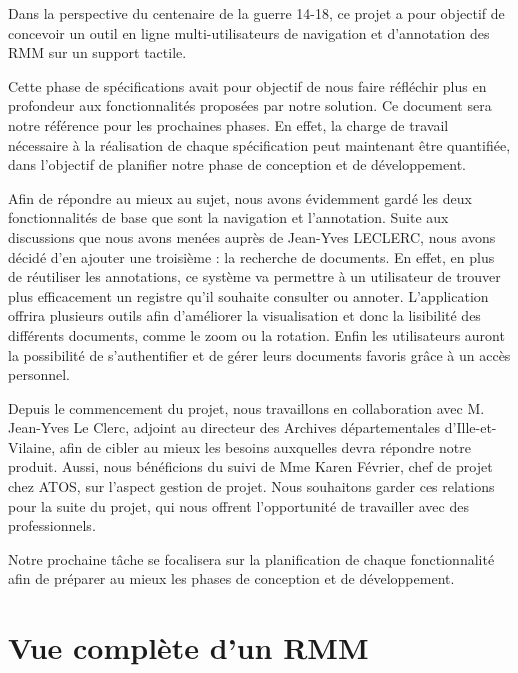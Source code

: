 \documentclass[a4paper]{article}
\begin{document}
Dans la perspective du centenaire de la guerre 14-18, ce projet a pour objectif de concevoir un outil en ligne multi-utilisateurs de navigation et d'annotation des RMM sur un support tactile.

Cette phase de spécifications avait pour objectif de nous faire réfléchir plus en profondeur aux fonctionnalités proposées par notre solution. Ce document sera notre référence pour les prochaines phases. En effet, la charge de travail nécessaire à la réalisation de chaque spécification peut maintenant être quantifiée, dans l'objectif de planifier notre phase de conception et de développement.

Afin de répondre au mieux au sujet, nous avons évidemment gardé les deux fonctionnalités de base que sont la navigation et l'annotation. Suite aux discussions que nous avons menées auprès de Jean-Yves LECLERC, nous avons décidé d'en ajouter une troisième : la recherche de documents. En effet, en plus de réutiliser les annotations, ce système va permettre à un utilisateur de trouver plus efficacement un registre qu'il souhaite consulter ou annoter. L'application offrira plusieurs outils afin d'améliorer la visualisation et donc la lisibilité des différents documents, comme le zoom ou la rotation. Enfin les utilisateurs auront la possibilité de s'authentifier et de gérer leurs documents favoris grâce à un accès personnel.

Depuis le commencement du projet, nous travaillons en collaboration avec M. Jean-Yves Le Clerc, adjoint au directeur des Archives départementales
d’Ille-et-Vilaine, afin de cibler au mieux les besoins auxquelles devra répondre notre produit. Aussi, nous bénéficions du suivi de Mme Karen Février, chef de projet chez ATOS, sur l'aspect gestion de projet. Nous souhaitons garder ces relations pour la suite du projet, qui nous offrent l'opportunité de travailler avec des professionnels.

Notre prochaine tâche se focalisera sur la planification de chaque fonctionnalité afin de préparer au mieux les phases de conception et de développement.






\appendix

\section{Vue compl\`ete d'un RMM}
\label{sec:annexe 1}
\end{document}
